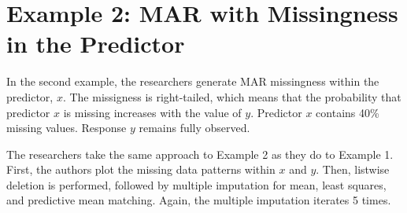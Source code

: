 \documentclass[12pt,oneside]{chicagocapstone}
\begin{document}
\section*{Example 2: MAR with Missingness in the
Predictor}\label{example-2-mar-with-missingness-in-the-predictor}

In the second example, the researchers generate MAR missingness within
the predictor, \(x\). The missigness is right-tailed, which means that
the probability that predictor \(x\) is missing increases with the value
of \(y\). Predictor \(x\) contains 40\% missing values. Response \(y\)
remains fully observed.

The researchers take the same approach to Example 2 as they do to
Example 1. First, the authors plot the missing data patterns within
\(x\) and \(y\). Then, listwise deletion is performed, followed by
multiple imputation for mean, least squares, and predictive mean
matching. Again, the multiple imputation iterates 5 times.
\end{document}
